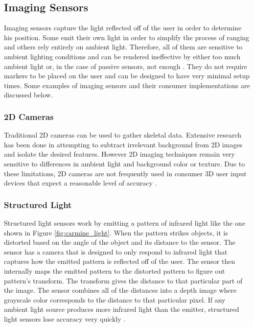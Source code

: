 \subsection{Imaging Sensors}

Imaging sensors capture the light reflected off of the user in order to determine his position. Some emit their own light in order to simplify the process of ranging and others rely entirely on ambient light. Therefore, all of them are sensitive to ambient lighting conditions and can be rendered ineffective by either too much ambient light or, in the case of passive sensors, not enough \cite{besl1988active}. They do not require markers to be placed on the user and can be designed to have very minimal setup times. Some examples of imaging sensors and their consumer implementations are discussed below.

\subsubsection{2D Cameras}

Traditional 2D cameras can be used to gather skeletal data. Extensive research has been done in attempting to subtract irrelevant background from 2D images and isolate the desired features. However 2D imaging techniques remain very sensitive to differences in ambient light and background color or texture. Due to these limitations, 2D cameras are not frequently used in consumer 3D user input devices that expect a reasonable level of accuracy \cite{shimada2001real}.

\subsubsection{Structured Light}

Structured light sensors work by emitting a pattern of infrared light like the one shown in Figure \ref{fig:carmine_light}. When the pattern strikes objects, it is distorted based on the angle of the object and its distance to the sensor. The sensor has a camera that is designed to only respond to infrared light that captures how the emitted pattern is reflected off of the user. The sensor then internally maps the emitted pattern to the distorted pattern to figure out pattern's transform. The transform gives the distance to that particular part of the image. The sensor combines all of the distances into a depth image where grayscale color corresponds to the distance to that particular pixel. If any ambient light source produces more infrared light than the emitter, structured light sensors lose accuracy very quickly \cite{scharstein2003high}.

